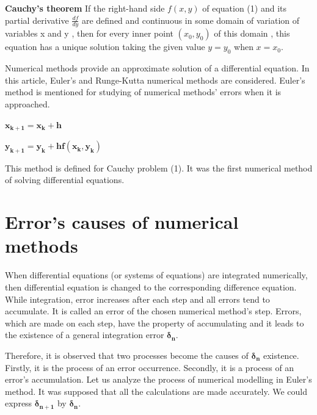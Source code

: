 \documentclass{article}
\begin{document}
\vspace{6mm}

\textbf{Cauchy's theorem} If the right-hand side $f(x, y)$ of equation (1) and its partial derivative $\frac{df}{dy}$ are defined and continuous in some domain of variation of variables x and y , then for every inner point $(x_0, y_0)$ of this domain , this equation has a unique solution taking the given value $y = y_0$ when $x = x_0$.

\vspace{6mm}

Numerical methods provide an approximate solution of a differential equation. In this article, Euler's and Runge-Kutta numerical methods are considered. Euler's method is mentioned for studying of numerical methods' errors when it is approached. 
\begin{myequation}
    \centerline{$\boldsymbol{x_{k+1} = x_k + h}$}
\end{myequation}
\begin{myequation}
    \centerline{$\boldsymbol{y_{k+1} = y_k + h f(x_k, y_k)}$}
\end{myequation}

This method is defined for Cauchy problem (1). It was the first numerical method of solving differential equations.




\section{Error's causes of numerical methods}
When differential equations (or systems of equations) are integrated numerically, then differential equation is changed to the corresponding difference equation. While integration, error increases after each step and all errors tend to accumulate. It is called an error of the chosen numerical method's step. Errors, which are made on each step, have the property of accumulating and it leads to the existence of a general integration error $\boldsymbol{\delta_n}$.  \\
\par Therefore, it is observed that two processes become the causes of $\boldsymbol{\delta_n}$ existence.
Firstly, it is the process of an error occurrence. Secondly, it is a process of an error's accumulation.
Let us analyze the process of numerical modelling in Euler's method. It was supposed that all the calculations are made accurately. We could express $\boldsymbol{\delta_{n+1}}$ by $\boldsymbol{\delta_n}$.
\end{document}
